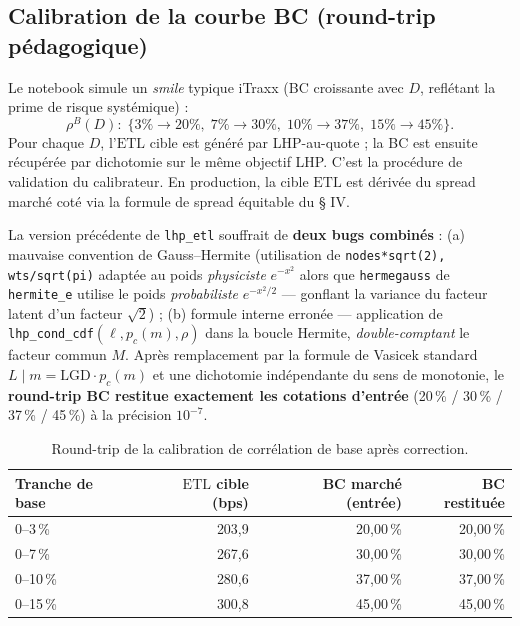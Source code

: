 \documentclass[11pt,a4paper]{article}
\newcommand{\LGD}{\mathrm{LGD}}
\newcommand{\ETL}{\mathrm{ETL}}
\begin{document}
\subsection{Calibration de la courbe BC (round-trip pédagogique)}

Le notebook simule un \emph{smile} typique iTraxx (BC croissante avec $D$,
reflétant la prime de risque systémique) :
\begin{equation}
\rho^B(D) :\;\{3\% \to 20\%,\; 7\% \to 30\%,\; 10\% \to 37\%,\; 15\% \to 45\%\}.
\end{equation}
Pour chaque $D$, l'$\ETL$ cible est généré par LHP-au-quote ; la BC est ensuite
récupérée par dichotomie sur le même objectif LHP. C'est la procédure de
validation du calibrateur. En production, la cible $\ETL$ est dérivée du spread
marché coté via la formule de spread équitable du § IV.

\begin{calloutnote}
La version précédente de \texttt{lhp\_etl} souffrait de \textbf{deux bugs
combinés} :
(a) mauvaise convention de Gauss--Hermite (utilisation de
\texttt{nodes*sqrt(2), wts/sqrt(pi)} adaptée au poids \emph{physiciste} $e^{-x^2}$
alors que \texttt{hermegauss} de \texttt{hermite\_e} utilise le poids
\emph{probabiliste} $e^{-x^2/2}$ --- gonflant la variance du facteur latent d'un
facteur $\sqrt{2}$) ;
(b) formule interne erronée --- application de
\texttt{lhp\_cond\_cdf}$(\ell, p_c(m), \rho)$ dans la boucle Hermite,
\emph{double-comptant} le facteur commun $M$.
Après remplacement par la formule de Vasicek standard
$L \mid m = \LGD \cdot p_c(m)$ et une dichotomie indépendante du sens de
monotonie, le \textbf{round-trip BC restitue exactement les cotations d'entrée}
(20\,\% / 30\,\% / 37\,\% / 45\,\%) à la précision $10^{-7}$.
\end{calloutnote}

\begin{table}[H]
\centering
\begin{tabular}{lrrr}
\toprule
\textbf{Tranche de base} & \textbf{$\ETL$ cible (bps)} & \textbf{BC marché (entrée)} & \textbf{BC restituée} \\
\midrule
0--3\,\%   & 203,9 & 20,00\,\% & 20,00\,\% \\
0--7\,\%   & 267,6 & 30,00\,\% & 30,00\,\% \\
0--10\,\%  & 280,6 & 37,00\,\% & 37,00\,\% \\
0--15\,\%  & 300,8 & 45,00\,\% & 45,00\,\% \\
\bottomrule
\end{tabular}
\caption{Round-trip de la calibration de corrélation de base après correction.}
\end{table}
\end{document}
